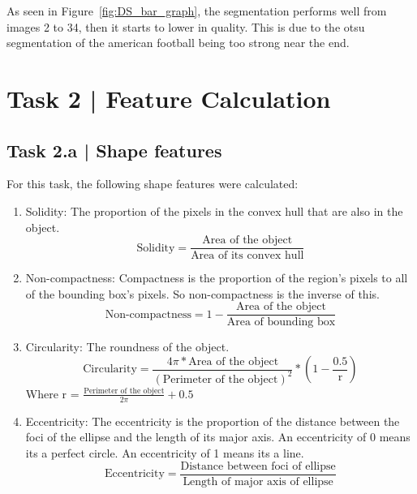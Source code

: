 \documentclass[conference]{IEEEtran}
\begin{document}
        As seen in Figure~\ref{fig:DS_bar_graph}, the segmentation performs well from images 2 to 34, then it starts to lower in quality.
        This is due to the otsu segmentation of the american football being too strong near the end.

\section*{Task 2 | Feature Calculation}

    \subsection*{Task 2.a | Shape features}

        For this task, the following shape features were calculated:
        \begin{enumerate}
            \item Solidity: The proportion of the pixels in the convex hull that are also in the object.
            \[\text{Solidity} = \frac{\text{Area of the object}}{\text{Area of its convex hull}}\]
            \item Non-compactness: Compactness is the proportion of the region's pixels to all of the bounding box's pixels. So non-compactness is the inverse of this.
            \[\text{Non-compactness} = 1 - \frac{\text{Area of the object}}{\text{Area of bounding box}}\]
            \item Circularity: The roundness of the object.
            \[\text{Circularity} = \frac{4\pi * \text{Area of the object}}{(\text{Perimeter of the object})^2} * \left(1 - \frac{0.5}{{\text{r}}}\right)\]
            Where r = $\frac{\text{Perimeter of the object}}{2\pi} + 0.5$
            \item Eccentricity: The eccentricity is the proportion of the distance between the foci of the ellipse and the length of its major axis. An eccentricity of 0 means its a perfect circle. An eccentricity of 1 means its a line.
            \[\text{Eccentricity} = \frac{\text{Distance between foci of ellipse}}{\text{Length of major axis of ellipse}}\]
        \end{enumerate}
\end{document}
